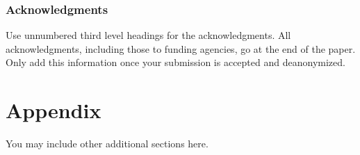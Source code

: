 \documentclass[10pt]{article} %
\begin{document}
\subsubsection*{Acknowledgments}
Use unnumbered third level headings for the acknowledgments. All
acknowledgments, including those to funding agencies, go at the end of the paper.
Only add this information once your submission is accepted and deanonymized. 




\newpage
\appendix
\section{Appendix}
You may include other additional sections here.
\end{document}
